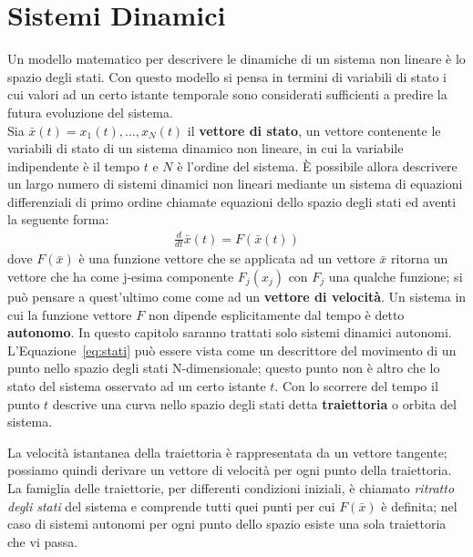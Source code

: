 
\chapter{Sistemi Dinamici} %
\label{cha:sistemi_dinamici}

Un modello matematico per descrivere le dinamiche di un sistema non lineare è lo spazio degli stati. Con questo modello si pensa in termini di variabili di stato i cui valori ad un certo istante temporale sono considerati sufficienti a predire la futura evoluzione del sistema.\\

Sia $\bar{x}(t) = x_1(t), \dots, x_N(t)$ il \textbf{vettore di stato}, un vettore contenente le variabili di stato di un sistema dinamico non lineare, in cui la variabile indipendente è il tempo $t$ e $N$ è l'ordine del sistema. È possibile allora descrivere un largo numero di sistemi dinamici non lineari mediante un sistema di equazioni differenziali di primo ordine chiamate equazioni dello spazio degli stati ed aventi la seguente forma:
\begin{align}
	\frac{d}{dt} \bar{x}(t) = F(\bar{x}(t))\label{eq:stati}
\end{align}
dove $F(\bar{x})$ è una funzione vettore che se applicata ad un vettore $\bar{x}$ ritorna un vettore che ha come j-esima componente $F_j(x_j)$ con $F_j$ una qualche funzione; si può pensare a quest'ultimo come come ad un \textbf{vettore di velocità}. Un sistema in cui la funzione vettore $F$ non dipende esplicitamente dal tempo è detto \textbf{autonomo}. In questo capitolo saranno trattati solo sistemi dinamici autonomi.\\

L'Equazione~\eqref{eq:stati} può essere vista come un descrittore del movimento di un punto nello spazio degli stati N-dimensionale; questo punto non è altro che lo stato del sistema osservato ad un certo istante $t$. Con lo scorrere del tempo il punto $t$ descrive una curva nello spazio degli stati detta \textbf{traiettoria} o orbita del sistema.

\newpage

La velocità istantanea della traiettoria è rappresentata da un vettore tangente; possiamo quindi derivare un vettore di velocità per ogni punto della traiettoria.
La famiglia delle traiettorie, per differenti condizioni iniziali, è chiamato \emph{ritratto degli stati} del sistema e comprende tutti quei punti per cui $F(\bar{x})$ è definita; nel caso di sistemi autonomi per ogni punto dello spazio esiste una sola traiettoria che vi passa.

